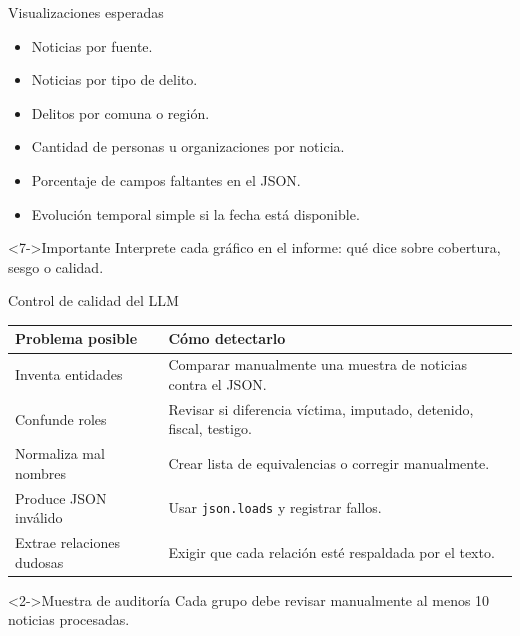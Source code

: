 \documentclass[11pt,aspectratio=169]{beamer}
\newcommand{\code}[1]{\texttt{#1}}
\begin{document}
\begin{frame}{Visualizaciones esperadas}
\small
\begin{itemize}[<+->]
\item Noticias por fuente.
\item Noticias por tipo de delito.
\item Delitos por comuna o región.
\item Cantidad de personas u organizaciones por noticia.
\item Porcentaje de campos faltantes en el JSON.
\item Evolución temporal simple si la fecha está disponible.
\end{itemize}

\begin{alertblock}<7->{Importante}
Interprete cada gráfico en el informe: qué dice sobre cobertura, sesgo o calidad.
\end{alertblock}
\end{frame}

\begin{frame}{Control de calidad del LLM}
\scriptsize
\begin{center}
\begin{tabular}{p{3.6cm}p{7.0cm}}
\toprule
\textbf{Problema posible} & \textbf{Cómo detectarlo} \\
\midrule
Inventa entidades & Comparar manualmente una muestra de noticias contra el JSON. \\
Confunde roles & Revisar si diferencia víctima, imputado, detenido, fiscal, testigo. \\
Normaliza mal nombres & Crear lista de equivalencias o corregir manualmente. \\
Produce JSON inválido & Usar \code{json.loads} y registrar fallos. \\
Extrae relaciones dudosas & Exigir que cada relación esté respaldada por el texto. \\
\bottomrule
\end{tabular}
\end{center}

\begin{block}<2->{Muestra de auditoría}
Cada grupo debe revisar manualmente al menos 10 noticias procesadas.
\end{block}
\end{frame}
\end{document}
